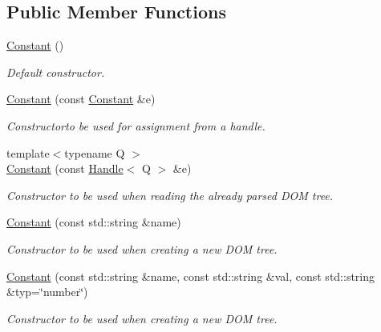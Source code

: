 \subsection*{Public Member Functions}
\begin{DoxyCompactItemize}
\item 
\hyperlink{class_d_d4hep_1_1_geometry_1_1_constant_a4f9e9cc06e1b01401343b855a8c03b9a}{Constant} ()
\begin{DoxyCompactList}\small\item\em Default constructor. \item\end{DoxyCompactList}\item 
\hyperlink{class_d_d4hep_1_1_geometry_1_1_constant_af3b65056d896ad0554a58d9160c3d358}{Constant} (const \hyperlink{class_d_d4hep_1_1_geometry_1_1_constant}{Constant} \&e)
\begin{DoxyCompactList}\small\item\em Constructorto be used for assignment from a handle. \item\end{DoxyCompactList}\item 
{\footnotesize template$<$typename Q $>$ }\\\hyperlink{class_d_d4hep_1_1_geometry_1_1_constant_a963a81eb77feeb0ecf30eb957c15c639}{Constant} (const \hyperlink{class_d_d4hep_1_1_handle}{Handle}$<$ Q $>$ \&e)
\begin{DoxyCompactList}\small\item\em Constructor to be used when reading the already parsed DOM tree. \item\end{DoxyCompactList}\item 
\hyperlink{class_d_d4hep_1_1_geometry_1_1_constant_afad7246c4626ec178f1d6a16739e7836}{Constant} (const std::string \&name)
\begin{DoxyCompactList}\small\item\em Constructor to be used when creating a new DOM tree. \item\end{DoxyCompactList}\item 
\hyperlink{class_d_d4hep_1_1_geometry_1_1_constant_a0f3d423fc380aa32ef1ea3b635ec4629}{Constant} (const std::string \&name, const std::string \&val, const std::string \&typ=\char`\"{}number\char`\"{})
\begin{DoxyCompactList}\small\item\em Constructor to be used when creating a new DOM tree. \item\end{DoxyCompactList}\item 

\end{DoxyCompactItemize}

